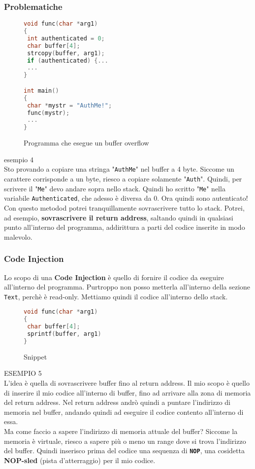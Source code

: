 \documentclass[a4paper,12pt]{article}
\begin{document}
\subsubsection{Problematiche}

\begin{figure}[H]
\begin{lstlisting}[language=C++]
void func(char *arg1)
{
 int authenticated = 0;
 char buffer[4];
 strcopy(buffer, arg1);
 if (authenticated) {...
 ...
}

int main()
{
 char *mystr = "AuthMe!";
 func(mystr);
 ...
}
\end{lstlisting}
\caption{Programma che esegue un buffer overflow}
\end{figure}
esempio 4\\
Sto provando a copiare una stringa "\texttt{AuthMe}" nel buffer a 4 byte. Siccome un carattere corrisponde a un byte, riesco a copiare solamente "\texttt{Auth}". Quindi, per scrivere il "\texttt{Me}" devo andare sopra nello stack. Quindi ho scritto "\texttt{Me}" nella variabile \texttt{Authenticated}, che adesso è diversa da 0. Ora quindi sono autenticato!\\
Con questo metodod potrei tranquillamente sovrascrivere tutto lo stack. Potrei, ad esempio, \textbf{sovrascrivere il return address}, saltando quindi in qualsiasi punto all'interno del programma, addirittura a parti del codice inserite in modo malevolo.

\subsubsection{Code Injection}
Lo scopo di una \textbf{Code Injection} è quello di fornire il codice da eseguire all'interno del programma. Purtroppo non posso metterla all'interno della sezione \texttt{Text}, perchè è read-only. Mettiamo quindi il codice all'interno dello stack.

\begin{figure}[H]
\begin{lstlisting}[language=C++]
void func(char *arg1)
{
 char buffer[4];
 sprintf(buffer, arg1)
}
\end{lstlisting}
\caption{Snippet}
\end{figure}
ESEMPIO 5\\
L'idea è quella di sovrascrivere buffer fino al return address. Il mio scopo è quello di inserire il mio codice all'interno di buffer, fino ad arrivare alla zona di memoria del return address. Nel return address andrò quindi a puntare l'indirizzo di memoria nel buffer, andando quindi ad eseguire il codice contento all'interno di essa.\\
Ma come faccio a sapere l'indirizzo di memoria attuale del buffer? Siccome la memoria è virtuale, riesco a sapere più o meno un range dove si trova l'indirizzo del buffer. Quindi inserisco prima del codice una sequenza di \textbf{\texttt{NOP}}, una cosidetta \textbf{NOP-sled} (pista d'atterraggio) per il mio codice.
\end{document}

